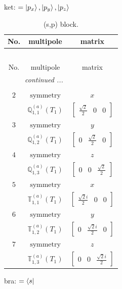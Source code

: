 \documentclass[fleqn,8pt,landscape]{jsarticle}
\begin{document}
\noindent
ket: $=\ket{p_{x}}, \ket{p_{y}}, \ket{p_{z}}$
\renewcommand{\arraystretch}{1.6}
\begin{longtable}{ccc}
\caption{(s,p) block.}
 \\
 \hline \hline
No. & multipole & matrix \\ \hline \endfirsthead

\multicolumn{2}{l}{\tablename\ \thetable{}} \\
 \hline \hline
No. & multipole & matrix \\ \hline \endhead

 \hline \hline
\multicolumn{2}{r}{\footnotesize\it continued ...} \\ \endfoot

 \hline \hline
\multicolumn{2}{r}{} \\ \endlastfoot

$ 2 $ & $ \text{symmetry} $ & $ x $ \\
$  $ & $ \mathbb{Q}_{1,1}^{(a)}(T_{1}) $ & $ \begin{bmatrix} \frac{\sqrt{2}}{2} & 0 & 0 \end{bmatrix} $ \\ \hline
$ 3 $ & $ \text{symmetry} $ & $ y $ \\
$  $ & $ \mathbb{Q}_{1,2}^{(a)}(T_{1}) $ & $ \begin{bmatrix} 0 & \frac{\sqrt{2}}{2} & 0 \end{bmatrix} $ \\ \hline
$ 4 $ & $ \text{symmetry} $ & $ z $ \\
$  $ & $ \mathbb{Q}_{1,3}^{(a)}(T_{1}) $ & $ \begin{bmatrix} 0 & 0 & \frac{\sqrt{2}}{2} \end{bmatrix} $ \\ \hline
$ 5 $ & $ \text{symmetry} $ & $ x $ \\
$  $ & $ \mathbb{T}_{1,1}^{(a)}(T_{1}) $ & $ \begin{bmatrix} \frac{\sqrt{2} i}{2} & 0 & 0 \end{bmatrix} $ \\ \hline
$ 6 $ & $ \text{symmetry} $ & $ y $ \\
$  $ & $ \mathbb{T}_{1,2}^{(a)}(T_{1}) $ & $ \begin{bmatrix} 0 & \frac{\sqrt{2} i}{2} & 0 \end{bmatrix} $ \\ \hline
$ 7 $ & $ \text{symmetry} $ & $ z $ \\
$  $ & $ \mathbb{T}_{1,3}^{(a)}(T_{1}) $ & $ \begin{bmatrix} 0 & 0 & \frac{\sqrt{2} i}{2} \end{bmatrix} $ \\ \hline
\end{longtable}
bra: $=\bra{s}$
\end{document}
